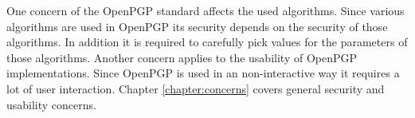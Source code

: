 One concern of the OpenPGP standard affects the used algorithms. Since various algorithms are used in OpenPGP its security depends on the security of those algorithms. In addition it is required to carefully pick values for the parameters of those algorithms. Another concern applies to the usability of OpenPGP implementations. Since OpenPGP is used in an non-interactive way it requires a lot of user interaction.
Chapter \ref{chapter:concerns} covers general security and usability concerns.

%
%
%
%
%
%
%
%
%
